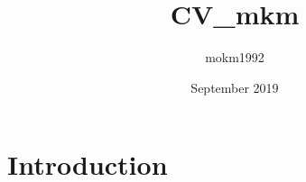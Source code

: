 \documentclass{article}
\title{CV_mkm}
\author{mokm1992 }
\date{September 2019}
\begin{document}
\maketitle

\section{Introduction}
\end{document}
